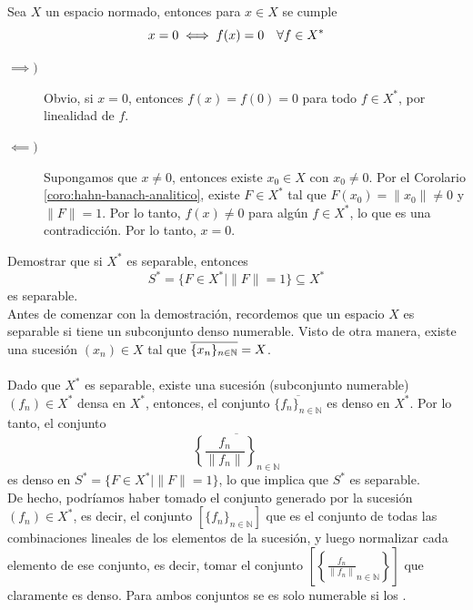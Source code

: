 \begin{ejercicio}
    Sea $X$ un espacio normado, entonces para $x\in X$ se cumple 
    \begin{equation*}
        x =  0 \iff f(x) = 0 \quad \forall f \in X^* \\
    \end{equation*}
    \begin{description}
        \item[$\implies)$] Obvio, si $x = 0$, entonces $f(x) = f(0) = 0$ para todo $f \in X^*$, por linealidad de $f$.
        \item[$\impliedby)$] Supongamos que $x \neq  0 $, entonces existe $x_0 \in X$ con $x_0 \neq 0$. Por el Corolario \ref{coro:hahn-banach-analitico}, existe $F \in X^*$ tal que $F(x_0) = \|x_0\| \neq 0$ y $\|F\| = 1$. Por lo tanto, $f(x) \neq 0$ para algún $f \in X^*$, lo que es una contradicción. Por lo tanto, $x = 0$. \\ 
    \end{description}
\end{ejercicio}

\begin{ejercicio}
    Demostrar que si $X^*$ es separable, entonces 
    $$S^* = \{ F \in X^* \mid \|F\| = 1 \} \subseteq X^*$$ 
    es separable. \\

    \noindent
    Antes de comenzar con la demostración, recordemos que un espacio $X$ es separable si tiene un subconjunto denso numerable. Visto de otra manera, existe una sucesión $(x_n) \in X$ tal que $\overline{\{ x_n \}_{n\in \mathbb{N}}} = X$. \\ \\
    \noindent
    Dado que $X^*$ es separable, existe una sucesión (subconjunto numerable) $(f_n) \in X^*$ densa en $X^*$, entonces, el conjunto $\overline{\{f_n\}_{n \in \mathbb{N}} }$ es denso en $X^*$. Por lo tanto, el conjunto 
    \begin{equation*}
        \overline{\left\{\dfrac{f_n}{\|f_n\|}\right\}_{n \in \mathbb{N}}}
    \end{equation*}
    es denso en $S^* = \{ F \in X^* \mid \|F\| = 1 \}$, lo que implica que $S^*$ es separable. \\

    \noindent
    De hecho, podríamos haber tomado el conjunto generado por la sucesión $(f_n) \in X^*$, es decir, el conjunto $[\{f_n\}_{n \in \mathbb{N}}]$ que es el conjunto de todas las combinaciones lineales de los elementos de la sucesión, y luego normalizar cada elemento de ese conjunto, es decir, tomar el conjunto $\left[\left\{ \frac{f_n}{\|f_n\|}_{n \in \mathbb{N}} \right\}\right] $ que claramente es denso. Para ambos conjuntos se es solo numerable si los .
\end{ejercicio}

